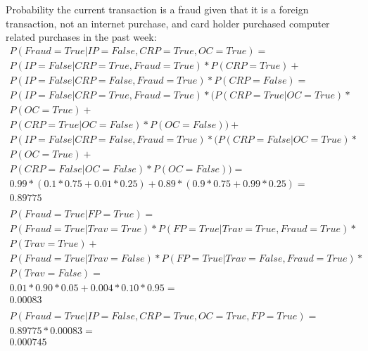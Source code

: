 \documentclass[11pt]{article}
\begin{document}
\begin{enumerate}
        Probability the current transaction is a fraud given that it is a foreign transaction, not an internet purchase, and card holder purchased computer related purchases in the past week:\\
        \begin{gather*}
        P(Fraud = True| IP = False, CRP = True, OC = True) =\\ P(IP = False| CRP = True, Fraud = True) * P(CRP = True) +\\ P(IP = False| CRP = False, Fraud = True) * P(CRP = False) =\\ P(IP = False| CRP = True, Fraud = True) * (P(CRP = True| OC = True) *\\ P(OC = True) +\\ P(CRP = True| OC = False) * P(OC = False)) +\\ P(IP = False| CRP = False, Fraud = True) * (P(CRP = False| OC = True) *\\ P(OC = True) +\\ P(CRP = False| OC = False) * P(OC = False)) =\\ 0.99 * (0.1 * 0.75 + 0.01 * 0.25) + 0.89 * (0.9 * 0.75 + 0.99 * 0.25) =\\ 0.89775\\
        \\
        P(Fraud = True| FP = True) =\\ P(Fraud = True| Trav = True) * P(FP = True| Trav = True, Fraud = True) *\\ P(Trav = True) +\\ P(Fraud = True| Trav = False) * P(FP = True| Trav = False, Fraud = True) *\\ P(Trav = False) =\\ 0.01 * 0.90 * 0.05 + 0.004 * 0.10 * 0.95 =\\ 0.00083\\
        \\
        P(Fraud = True | IP = False, CRP = True, OC = True, FP = True) =\\ 0.89775 * 0.00083 =\\ 0.000745\\
        \end{gather*}
    \end{enumerate}
\end{document}
